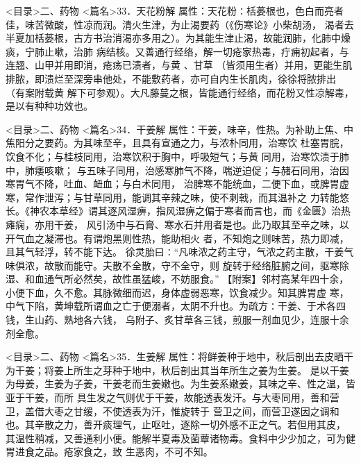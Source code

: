 \documentclass[a4paper,12pt,UTF8,twoside]{ctexbook}
\begin{document}
<目录>二、药物
<篇名>33．天花粉解
属性：天花粉∶栝蒌根也，色白而亮者佳，味苦微酸，性凉而润。清火生津，为止渴要药（《伤寒论》小柴胡汤， 
渴者去半夏加栝蒌根，古方书治消渴亦多用之）。为其能生津止渴，故能润肺，化肺中燥痰，宁肺止嗽，治肺 
病结核。又善通行经络，解一切疮家热毒，疔痈初起者，与连翘、山甲并用即消，疮疡已溃者，与黄 、甘草 
（皆须用生者）并用，更能生肌排脓，即溃烂至深旁串他处，不能敷药者，亦可自内生长肌肉，徐徐将脓排出 
（有案附载黄 解下可参观）。大凡藤蔓之根，皆能通行经络，而花粉又性凉解毒，是以有种种功效也。 

<目录>二、药物
<篇名>34．干姜解
属性：干姜，味辛，性热。为补助上焦、中焦阳分之要药。为其味至辛，且具有宣通之力，与浓朴同用，治寒饮 
杜塞胃脘，饮食不化；与桂枝同用，治寒饮积于胸中，呼吸短气；与黄 同用，治寒饮渍于肺中，肺痿咳嗽； 
与五味子同用，治感寒肺气不降，喘逆迫促；与赭石同用，治因寒胃气不降，吐血、衄血；与白术同用， 
治脾寒不能统血，二便下血，或脾胃虚寒，常作泄泻；与甘草同用，能调其辛辣之味，使不刺戟，而其温补之 
力转能悠长。《神农本草经》谓其逐风湿痹，指风湿痹之偏于寒者而言也，而《金匮》治热瘫痫，亦用干姜， 
风引汤中与石膏、寒水石并用者是也。此乃取其至辛之味，以开气血之凝滞也。有谓炮黑则性热，能助相火 
者，不知炮之则味苦，热力即减，且其气轻浮，转不能下达。 
徐灵胎曰∶“凡味浓之药主守，气浓之药主散，干姜气味俱浓，故散而能守。夫散不全散，守不全守，则 
旋转于经络脏腑之间，驱寒除湿、和血通气所必然矣，故性虽猛峻，不妨服食。” 
【附案】邻村高某年四十余，小便下血，久不愈。其脉微细而迟，身体虚弱恶寒，饮食减少。知其脾胃虚 
寒，中气下陷，黄坤载所谓血之亡于便溺者，太阴不升也。为疏方∶干姜、于术各四钱，生山药、熟地各六钱， 
乌附子、炙甘草各三钱，煎服一剂血见少，连服十余剂全愈。 

<目录>二、药物
<篇名>35．生姜解
属性：将鲜姜种于地中，秋后剖出去皮晒干为干姜；将姜上所生之芽种于地中，秋后剖出其当年所生之姜为生姜。 
是以干姜为母姜，生姜为子姜，干姜老而生姜嫩也。为生姜系嫩姜，其味之辛、性之温，皆亚于干姜，而所 
具生发之气则优于干姜，故能透表发汗。与大枣同用，善和营卫，盖借大枣之甘缓，不使透表为汗，惟旋转于 
营卫之间，而营卫遂因之调和也。其辛散之力，善开痰理气，止呕吐，逐除一切外感不正之气。若但用其皮， 
其温性稍减，又善通利小便。能解半夏毒及菌蕈诸物毒。食料中少少加之，可为健胃进食之品。疮家食之，致 
生恶肉，不可不知。 
\end{document}
